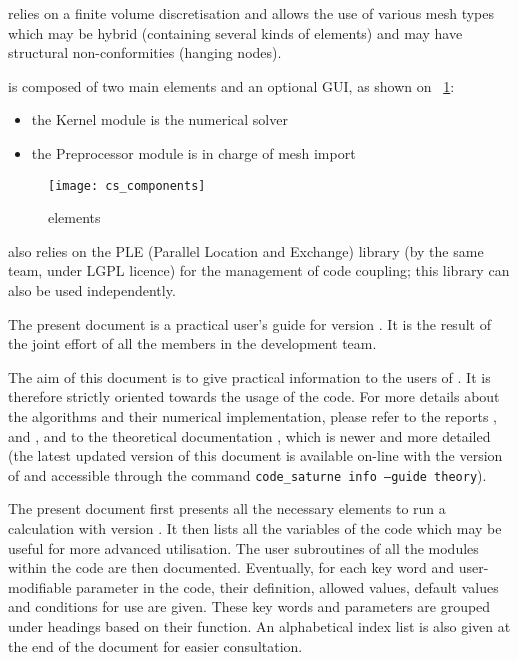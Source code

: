 \CS relies on a finite volume discretisation and allows the use of
various mesh types which may be hybrid (containing several kinds of
elements) and may have structural non-conformities (hanging nodes).


\CS is composed of two main elements and an optional GUI,
as shown on \figurename~\ref{fig:elements}:
\begin{itemize}
\item the Kernel module is the numerical solver
\item the Preprocessor module is in charge of mesh import\\
\end{itemize}

\begin{figure}[!h]
\centerline{
\texttt{[image: cs\_components]}}
\caption{\CS elements}\label{fig:elements}
\end{figure}

\indent\CS also relies on the PLE (Parallel Location and Exchange) library (by
the same team, under LGPL licence) for the management of code coupling;
this library can also be used independently.

The present document is a practical user's guide for \CS version \verscs.
It is the result of the joint effort of
all the members in the development team.

The aim of this document is to give practical information to the users of
\CS. It is therefore strictly oriented towards the usage of the code.
For more details about the algorithms and their numerical
implementation, please refer to the reports \cite{ijvf},
 \cite{boucker00} and \cite{mechitoua98}, and to the theoretical documentation \cite{theory},
which is newer and more detailed
(the latest updated version of this document
is available on-line with the version of \CS and accessible through the command
\texttt{code\_saturne info --guide theory}).

The present document first
presents all the necessary elements to run a calculation
with \CS version \verscs. It then lists all the variables of the code
which may be useful for more advanced utilisation.
The user subroutines of all the modules within the code are then documented.
Eventually, for each key word and user-modifiable parameter in the code,
their definition, allowed values, default values and conditions for use are given.
These key words and parameters are grouped under headings
based on their function. An alphabetical index list is also given at the end of
the document for easier consultation.

